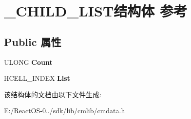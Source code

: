 \hypertarget{struct___c_h_i_l_d___l_i_s_t}{}\section{\+\_\+\+C\+H\+I\+L\+D\+\_\+\+L\+I\+S\+T结构体 参考}
\label{struct___c_h_i_l_d___l_i_s_t}
\subsection*{Public 属性}
\begin{DoxyCompactItemize}
\item 
\mbox{\label{struct___c_h_i_l_d___l_i_s_t_acc62f6b6f0bb996edc4a417591512da2}} 
U\+L\+O\+NG {\bfseries Count}
\item 
\mbox{\label{struct___c_h_i_l_d___l_i_s_t_a5db8df6271cb7eff50920eb8eb659355}} 
H\+C\+E\+L\+L\+\_\+\+I\+N\+D\+EX {\bfseries List}
\end{DoxyCompactItemize}


该结构体的文档由以下文件生成\+:\begin{DoxyCompactItemize}
\item 
E\+:/\+React\+O\+S-\/0../sdk/lib/cmlib/cmdata.\+h\end{DoxyCompactItemize}
